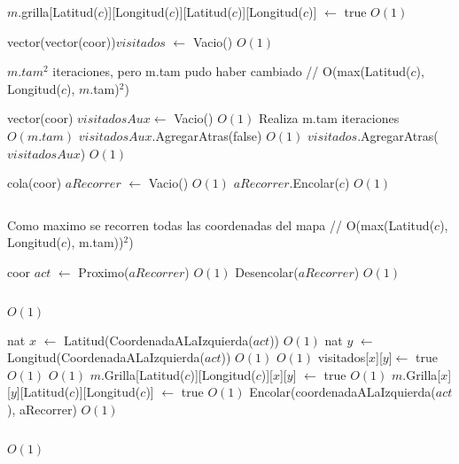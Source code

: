 \begin{Algoritmos}
\begin{algorithmic}[1]
\EndIf

\State $m$.grilla[Latitud($c$)][Longitud($c$)][Latitud($c$)][Longitud($c$)] $\gets$ true \Comment $O(1)$
\State $ $


\State vector(vector(coor))$visitados$ $\gets$ Vacio() \Comment $O(1)$

	    \Comment $m.tam^2$ iteraciones, pero m.tam pudo haber cambiado // O(max(Latitud($c$), Longitud($c$), $m$.tam)$^2$)

	\State vector(coor) $visitadosAux \gets$ Vacio()  \Comment $O(1)$	
	      \Comment Realiza m.tam iteraciones $O(m.tam)$
		\State $visitadosAux$.AgregarAtras(false) \Comment $O(1)$
	\EndFor
	\State $visitados$.AgregarAtras($visitadosAux$) \Comment $O(1)$
\EndFor


\State cola(coor) $aRecorrer$ $\gets$ Vacio() \Comment $O(1)$
\State $aRecorrer$.Encolar($c$) \Comment $O(1)$

\State $ $

 \Comment Como maximo se recorren todas las coordenadas del mapa // O(max(Latitud($c$), Longitud($c$), m.tam))$^2$)

\State coor $act$ $\gets$ Proximo($aRecorrer$) \Comment  $O(1)$
\State Desencolar($aRecorrer$) \Comment $O(1)$

\State $ $




      \Comment $O(1)$

\State nat $x$ $\gets$ Latitud(CoordenadaALaIzquierda($act$))   \Comment $O(1)$
\State nat $y$ $\gets$ Longitud(CoordenadaALaIzquierda($act$))  \Comment $O(1)$
    \Comment $O(1)$
\State visitados[$x$][$y$]$ \gets$ true    \Comment $O(1)$
	 	\Comment $O(1)$
		\State $m$.Grilla[Latitud($c$)][Longitud($c$)][$x$][$y$] $ \gets $ true \Comment $O(1)$
		\State $m$.Grilla[$x$][$y$][Latitud($c$)][Longitud($c$)] $ \gets $ true \Comment $O(1)$
		\State Encolar(coordenadaALaIzquierda($act$), aRecorrer) \Comment $O(1)$	
	\EndIf
\EndIf
\EndIf

\State $ $

      \Comment $O(1)$


\end{algorithmic}
\end{Algoritmos}
